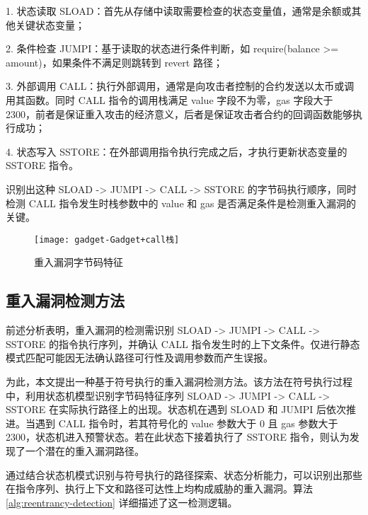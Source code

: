 \documentclass[print, master, vlined, timesmath]{DissertUESTC}
\begin{document}
1. 状态读取 SLOAD：首先从存储中读取需要检查的状态变量值，通常是余额或其他关键状态变量；

2. 条件检查 JUMPI：基于读取的状态进行条件判断，如 require(balance >= amount)，如果条件不满足则跳转到 revert 路径；

3. 外部调用 CALL：执行外部调用，通常是向攻击者控制的合约发送以太币或调用其函数。同时 CALL 指令的调用栈满足 value 字段不为零，gas 字段大于 2300，前者是保证重入攻击的经济意义，后者是保证攻击者合约的回调函数能够执行成功；

4. 状态写入 SSTORE：在外部调用指令执行完成之后，才执行更新状态变量的 SSTORE 指令。

识别出这种 SLOAD ->  JUMPI -> CALL -> SSTORE 的字节码执行顺序，同时检测 CALL 指令发生时栈参数中的 value 和 gas 是否满足条件是检测重入漏洞的关键。


\begin{figure}[h]
    \centering
    \texttt{[image: gadget-Gadget+call栈]}
    \caption{重入漏洞字节码特征}
    \label{fig:重入gadget}
\end{figure}


\subsection{重入漏洞检测方法}



前述分析表明，重入漏洞的检测需识别 SLOAD -> JUMPI -> CALL -> SSTORE 的指令执行序列，并确认 CALL 指令发生时的上下文条件。仅进行静态模式匹配可能因无法确认路径可行性及调用参数而产生误报。

为此，本文提出一种基于符号执行的重入漏洞检测方法。该方法在符号执行过程中，利用状态机模型识别字节码特征序列 SLOAD -> JUMPI -> CALL -> SSTORE 在实际执行路径上的出现。状态机在遇到 SLOAD 和 JUMPI 后依次推进。当遇到 CALL 指令时，若其符号化的 value 参数大于 0 且 gas 参数大于 2300，状态机进入预警状态。若在此状态下接着执行了 SSTORE 指令，则认为发现了一个潜在的重入漏洞路径。

通过结合状态机模式识别与符号执行的路径探索、状态分析能力，可以识别出那些在指令序列、执行上下文和路径可达性上均构成威胁的重入漏洞。算法 \ref{alg:reentrancy-detection} 详细描述了这一检测逻辑。
\end{document}

